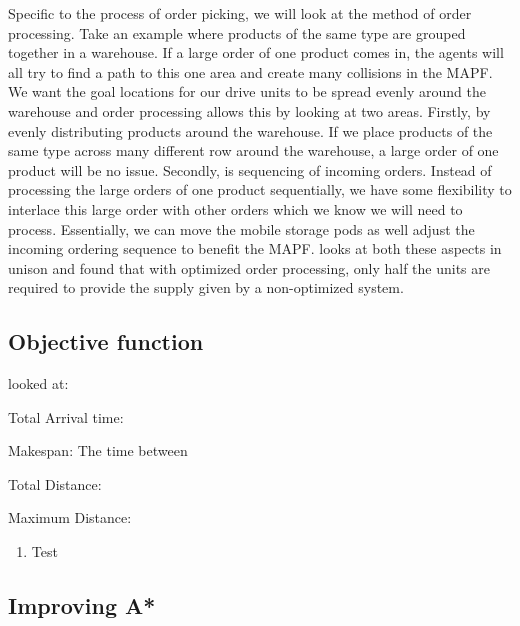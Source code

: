 \documentclass[a4paper,11pt]{article}
\begin{document}

Specific to the process of order picking, we will look at the method of order processing. Take an example where products of the same type are grouped together in a warehouse. If a large order of one product comes in, the agents will all try to find a path to this one area and create many collisions in the MAPF. We want the goal locations for our drive units to be spread evenly around the warehouse and order processing allows this by looking at two areas. Firstly, by evenly distributing products around the warehouse. If we place products of the same type across many different row around the warehouse, a large order of one product will be no issue. Secondly, is sequencing of incoming orders. Instead of processing the large orders of one product sequentially, we have some flexibility to interlace this large order with other orders which we know we will need to process. Essentially, we can move the mobile storage pods as well adjust the incoming ordering sequence to benefit the MAPF. \cite{boysen2017parts} looks at both these aspects in unison and found that with optimized order processing, only half the units are required to provide the supply given by a non-optimized system.

\subsection{Objective function}

\cite{yu2015optimal} looked at: 
\begin{compactenum}
	\item Total Arrival time: 
	\item Makespan: The time between 
	\item Total Distance: 
	\item Maximum Distance: 
\end{compactenum}

\begin{enumerate}
	\item Test
\end{enumerate}



\subsubsection{}

\subsection{Improving A*}
\end{document}
